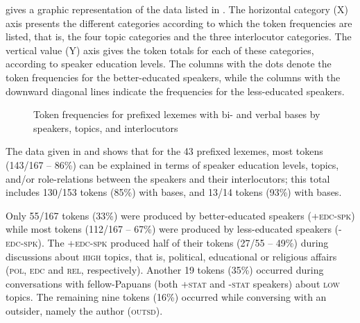 gives a graphic representation of the data listed in . The horizontal category (X) axis presents the different categories according to which the token frequencies are listed, that is, the four topic categories and the three interlocutor categories. The vertical value (Y) axis gives the token totals for each of these categories, according to speaker education levels. The columns with the dots denote the token frequencies for the better-educated speakers, while the columns with the downward diagonal lines indicate the frequencies for the less-educated speakers.



\begin{figure}
\centering
\caption[Token frequencies for {ter-}prefixed lexemes with bi- and  verbal bases by speakers, topics, and interlocutors\label{Figure_3.1}]{Token frequencies for prefixed lexemes with bi- and  verbal bases by speakers, topics, and interlocutors\label{Figure_3.1}}
\end{figure}


The data given in  and  shows that for the 43 prefixed lexemes, most tokens (143/167 – 86\%) can be explained in terms of speaker education levels, topics, and/or role-relations between the speakers and their interlocutors; this total includes 130/153 tokens (85\%) with  bases, and 13/14 tokens (93\%) with  bases.


Only 55/167 tokens (33\%) were produced by better-educated speakers (\textsc{+edc-spk}) while most tokens (112/167 – 67\%) were produced by less-educated speakers (\textsc{-edc-spk}). The \textsc{+edc-spk} produced half of their tokens (27/55 – 49\%) during discussions about \textsc{high} topics, that is, political, educational or religious affairs (\textsc{pol}, \textsc{edc} and \textsc{rel}, respectively). Another 19 tokens (35\%) occurred during conversations with fellow-Papuans (both \textsc{+stat} and \textsc{-stat} speakers) about \textsc{low} topics. The remaining nine tokens (16\%) occurred while conversing with an outsider, namely the author (\textsc{outsd}).




